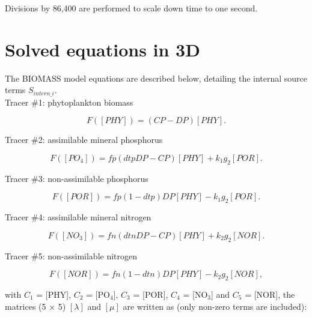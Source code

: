 Divisions by 86,400 are performed to scale down time to one second.

\section{Solved equations in 3D}

The BIOMASS model equations are described below, detailing the internal source terms $S_{intern\_i}$.\\

Tracer $\#$1: phytoplankton biomass

\begin{equation}
  F([PHY]) = (CP-DP) [PHY].
\end{equation}

Tracer $\#$2: assimilable mineral phosphorus

\begin{equation}
  F([PO_4]) = fp(dtp DP - CP) [PHY] + k_1 g_2 [POR].
\end{equation}

Tracer $\#$3: non-assimilable phosphorus

\begin{equation}
  F([POR]) = fp(1-dtp) DP [PHY] - k_1 g_2 [POR].
\end{equation}

Tracer $\#$4: assimilable mineral nitrogen

\begin{equation}
  F([NO_3]) = fn (dtn DP - CP) [PHY] + k_2 g_2 [NOR].
\end{equation}

Tracer $\#$5: non-assimilable nitrogen

\begin{equation}
  F([NOR]) = fn (1- dtn) DP [PHY] - k_2 g_2 [NOR],
\end{equation}

with $C_1$ = [PHY], $C_2$ = [PO$_4$], $C_3$ = [POR], $C_4$ = [NO$_3$] and $C_5$ = [NOR],
the matrices (5 $\times$ 5) $[\lambda]$ and $[\mu]$
are written as (only non-zero terms are included):


